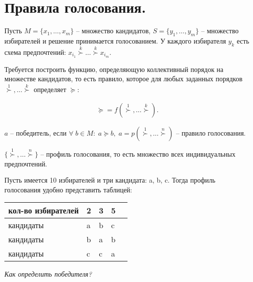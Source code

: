 \chapter{Правила голосования.}\label{cha:4}

Пусть $M = \{ x_1, \ldots, x_m \}$ -- множество кандидатов, $S = \{ y_1, \ldots, y_m \}$ -- множество избирателей и решение принимается голосованием. У каждого избирателя $y_k$ есть схема предпочтений: $x_{i_1} \stackrel{k}{\succ} \ldots \stackrel{k}{\succ} x_{i_m}$.

Требуется построить функцию, определяющую коллективный порядок на множестве кандидатов, то есть правило, которое для любых заданных порядков $\stackrel{1}{\succ}, \ldots \stackrel{k}{\succ}$ определяет  $\succeq$:

\begin{gather*}
	\succeq = f(\stackrel{1}{\succ}, \ldots \stackrel{k}{\succ}).
\end{gather*}

\begin{definition}
	$a$ -- победитель, если $\forall \; b \in M: \; a \succeq b, \; a = p (\stackrel{1}{\succ}, \ldots \stackrel{n}{\succ})$ -- правило голосования.
\end{definition}

\begin{definition}
	$\{ \stackrel{1}{\succ}, \ldots \stackrel{n}{\succ} \}$ -- профиль голосования, то есть множество всех индивидуальных предпочтений.
\end{definition}

\begin{example}
	Пусть имеется 10 избирателей и три кандидата: a, b, c. Тогда профиль голосования удобно представить таблицей:\vspace{0.5cm}

	\begin{tabular}{ | l | l | l | l | l | }
		\hline
			кол-во избирателей & 2 & 3 & 5 \\ \hline
			кандидаты & a & b & c \\
			кандидаты & b & a & b \\
			кандидаты & c & c & a \\
		\hline
	\end{tabular}
\end{example}

\begin{question}
	\textit{Как определить победителя?}
\end{question}

